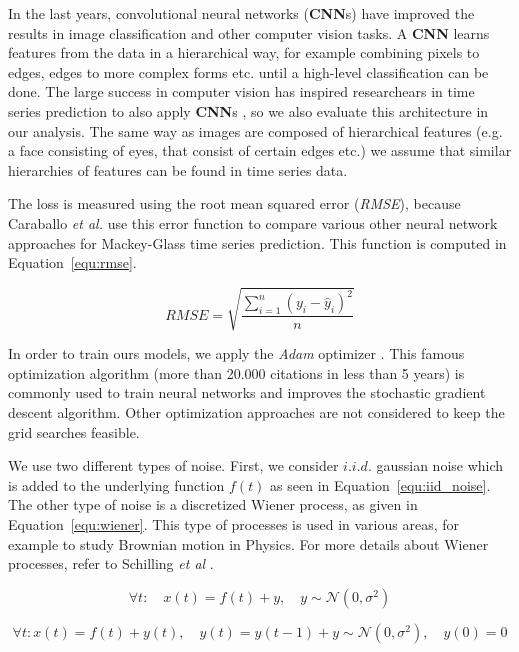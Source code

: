 \documentclass{article}
\begin{document}
In the last years, convolutional neural networks (\textbf{CNN}s) have improved
the results in image classification \cite{krizhevsky2012} and other computer
vision tasks. A \textbf{CNN} learns features from the data in a hierarchical
way, for example combining pixels to edges, edges to more complex forms etc.
until a high-level classification can be done. The large success in computer
vision has inspired researchears in time series prediction to also apply
\textbf{CNN}s \cite{cui2016, borovykh2017}, so we also evaluate this
architecture in our analysis. The same way as images are composed of
hierarchical features (e.g. a face consisting of eyes, that consist of
certain edges etc.) we assume that similar hierarchies of features can be found
in time series data.

\newpage
The loss is measured using the root mean squared error (\emph{RMSE}), because
Caraballo \textit{et al.} \cite{caraballo2016} use this error function to
compare various other neural network approaches for Mackey-Glass time series
prediction. This function is computed in Equation~\ref{equ:rmse}.

\begin{equation}
    RMSE = \sqrt{\frac{\sum_{i=1}^n (y_i - \hat{y}_i)^2}{n}}
    \label{equ:rmse}
\end{equation}

In order to train ours models, we apply the \emph{Adam} optimizer
\cite{kingma2014}. This famous optimization algorithm (more than 20.000
citations in less than 5 years) is commonly used to train neural networks and
improves the stochastic gradient descent algorithm. Other optimization
approaches are not considered to keep the grid searches feasible.

We use two different types of noise. First, we consider $i.i.d.$ gaussian
noise which is added to the underlying function $f(t)$
as seen in Equation~\ref{equ:iid_noise}. The other type of noise is a
discretized Wiener process, as given in Equation~\ref{equ:wiener}.
This type of processes is used in various areas,
for example to study Brownian motion in Physics.
For more details about Wiener processes, refer to Schilling
\textit{et al} \cite{schilling2014}.

\begin{equation}
    \forall t: \quad x(t) = f(t) + y, \quad y \sim \mathcal{N}(0, \sigma^2)
    \label{equ:iid_noise}
\end{equation}

\begin{equation}
    \forall t: x(t) = f(t) + y(t), \quad y(t) = y(t-1) + y \sim \mathcal{N}(0, \sigma^2), \quad y(0) = 0
    \label{equ:wiener}
\end{equation}
\end{document}
